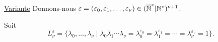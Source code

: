 \uline{Variante} Donnons-nous $\varepsilon=(\varepsilon_0,\varepsilon_1,\ldots,\varepsilon_\nu)\in(\overline{\mathbb N}^{*}|\mathbb N^{*})^{\nu+1}$\inserted{$[1,\infty]$}.

Soit
\[
L_\nu^\varepsilon=\{\lambda_0,\ldots,\lambda_\nu\mid\lambda_0\lambda_1\cdots\lambda_\nu=\lambda_0^{\varepsilon_0}=\lambda_1^{\varepsilon_1}=\cdots=\lambda_\nu^{\varepsilon_\nu}=1\}.
\]

